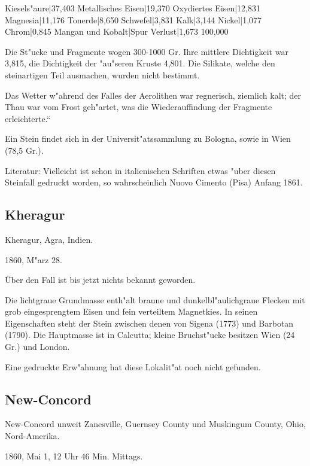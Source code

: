 \documentclass[a4paper, 11pt, oneside]{article}
\begin{document}
Kiesels"aure|37,403  
Metallisches Eisen|19,370  
Oxydiertes Eisen|12,831  
Magnesia|11,176  
Tonerde|8,650  
Schwefel|3,831  
Kalk|3,144  
Nickel|1,077  
Chrom|0,845  
Mangan und Kobalt|Spur  
Verlust|1,673  
100,000

Die St"ucke und Fragmente wogen 300-1000 Gr. Ihre mittlere Dichtigkeit war 3,815, die Dichtigkeit der "au"seren Kruste 4,801. Die Silikate, welche den steinartigen Teil ausmachen, wurden nicht bestimmt.

Das Wetter w"ahrend des Falles der Aerolithen war regnerisch, ziemlich kalt; der Thau war vom Frost geh"artet, was die Wiederauffindung der Fragmente erleichterte.“

Ein Stein findet sich in der Universit"atssammlung zu Bologna, sowie in Wien (78,5 Gr.).

Literatur: Vielleicht ist schon in italienischen Schriften etwas "uber diesen Steinfall gedruckt worden, so wahrscheinlich Nuovo Cimento (Pisa) Anfang 1861.

\subsection{Kheragur}

Kheragur, Agra, Indien.

1860, M"arz 28.

Über den Fall ist bis jetzt nichts bekannt geworden.

Die lichtgraue Grundmasse enth"alt braune und dunkelbl"aulichgraue Flecken mit grob eingesprengtem Eisen und fein verteiltem Magnetkies. In seinen Eigenschaften steht der Stein zwischen denen von Sigena (1773) und Barbotan (1790). Die Hauptmasse ist in Calcutta; kleine Bruchst"ucke besitzen Wien (24 Gr.) und London.

Eine gedruckte Erw"ahnung hat diese Lokalit"at noch nicht gefunden.

\subsection{New-Concord}

New-Concord unweit Zanesville, Guernsey County und Muskingum County, Ohio, Nord-Amerika.

1860, Mai 1, 12 Uhr 46 Min. Mittags.
\end{document}
